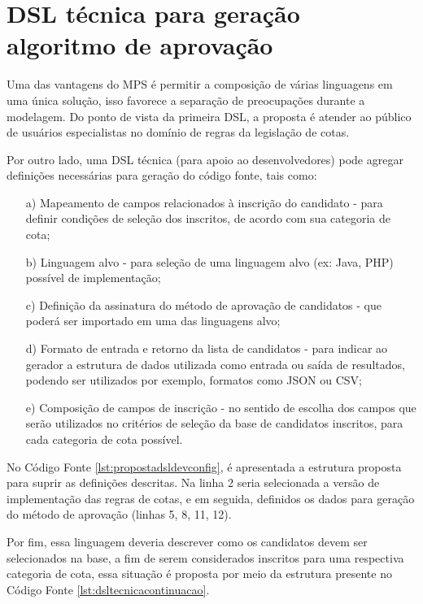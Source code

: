 \section{DSL técnica para geração algoritmo de aprovação}
\label{sec:dslproposta:dev}

 Uma das vantagens do \gls{MPS} é permitir a composição de várias linguagens em uma única solução, isso favorece a separação de preocupações durante a modelagem. Do ponto de vista da primeira \gls{DSL}, a proposta é atender ao público de usuários especialistas no domínio de regras da legislação de cotas. 
 
 Por outro lado, uma \gls{DSL} técnica (para apoio ao desenvolvedores) pode agregar definições necessárias para geração do código fonte, tais como:
 
 \begin{enumerate}
     \item[a)] Mapeamento de campos relacionados à inscrição do candidato - para definir condições de seleção dos inscritos, de acordo com sua categoria de cota;
     \item[b)] Linguagem alvo - para seleção de uma linguagem alvo (ex: Java, PHP) possível de implementação;
     \item[c)] Definição da assinatura do método de aprovação de candidatos - que poderá ser importado em uma das linguagens alvo;
     \item[d)] Formato de entrada e retorno da lista de candidatos - para indicar ao gerador a estrutura de dados utilizada como entrada ou saída de resultados, podendo ser utilizados por exemplo, formatos como JSON ou CSV;
     \item[e)] Composição de campos de inscrição - no sentido de escolha dos campos que serão utilizados no critérios de seleção da base de candidatos inscritos, para cada categoria de cota possível.
 \end{enumerate}
 
    No Código Fonte \ref{lst:propostadsldevconfig}, é apresentada a estrutura proposta para suprir as definições descritas. Na linha 2 seria selecionada a versão de implementação das regras de cotas, e em seguida, definidos os dados para geração do método de aprovação (linhas 5, 8, 11, 12). 
    
    
 
 Por fim, essa linguagem deveria descrever como os candidatos devem ser selecionados na base, a fim de serem considerados inscritos para uma respectiva categoria de cota, essa situação é proposta por meio da estrutura presente no Código Fonte \ref{lst:dsltecnicacontinuacao}.
 
